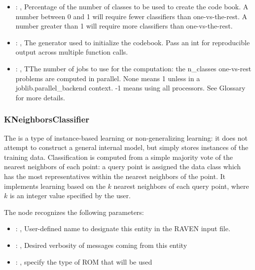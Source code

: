 \begin{itemize}
    \item {}: ,
      Percentage of the number of classes to be used to create
      the code book. A number between 0 and 1 will require fewer classifiers
      than one-vs-the-rest. A number greater than 1 will require more classifiers
      than one-vs-the-rest.

    \item {}: ,
      The generator used to initialize the codebook. Pass an int
      for reproducible output across multiple function calls.

    \item {}: ,
      TThe number of jobs to use for the computation: the n\_classes one-vs-rest
      problems are computed in parallel. None means 1 unless in a joblib.parallel\_backend
      context. -1 means using all processors. See Glossary for more details.
  \end{itemize}


\subsubsection{KNeighborsClassifier}
  The  is a type of instance-based learning or
  non-generalizing learning: it does not attempt to construct a general internal
  model, but simply stores instances of the training data.                          Classification
  is computed from a simple majority vote of the nearest neighbors                          of each
  point: a query point is assigned the data class which has the most
  representatives within the nearest neighbors of the point.                          It implements
  learning based on the $k$ nearest neighbors of each query point,                          where
  $k$ is an integer value specified by the user.

  The  node recognizes the following parameters:
    \begin{itemize}
      \item {}: ,
        User-defined name to designate this entity in the RAVEN input file.
      \item {}: ,
        Desired verbosity of messages coming from this entity
      \item {}: ,
        specify the type of ROM that will be used
  \end{itemize}

